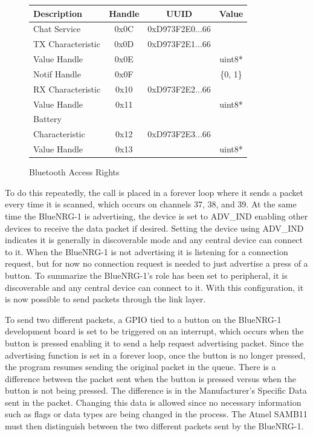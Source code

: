 \documentclass[journal,compsoc]{IEEEtran}
\begin{document}
\begin{figure}
  \begin{tabular}{|l|c|c|c|}
      \hline
      Description         &Handle& UUID              & Value\\
      \hline
      Chat Service 	      & 0x0C & 0xD973F2E0...66   & \\
      \hline
      TX Characteristic   & 0x0D & 0xD973F2E1...66   & \\
      \hline
      Value Handle	      & 0x0E & 				     & uint8*\\
      \hline
      Notif Handle        & 0x0F & 			         & \{0, 1\}\\
      \hline
      RX Characteristic   & 0x10 & 0xD973F2E2...66   & \\
      \hline
      Value Handle		  & 0x11 &					 & uint8*\\
      \hline
      Battery 		      &		 &					 & \\
      Characteristic	  & 0x12 & 0xD973F2E3...66   & \\
      \hline
      Value Handle		  & 0x13 & 					 & uint8*\\
      \hline
  \end{tabular}
  \caption{Bluetooth Access Rights}
  \label{BT Access}
\end{figure}

To do this repeatedly, the call is placed in a forever loop where it sends a packet every time it is scanned, which occurs on channels 37, 38, and 39.  At the same time the BlueNRG-1 is advertising, the device is set to ADV\_IND enabling other devices to receive the data packet if desired.  Setting the device using ADV\_IND indicates it is generally in discoverable mode and any central device can connect to it.  When the BlueNRG-1 is not advertising it is listening for a connection request, but for now no connection request is needed to just advertise a press of a button. To summarize the BlueNRG-1’s role has been set to peripheral, it is discoverable and any central device can connect to it.  With this configuration, it is now possible to send packets through the link layer.

To send two different packets, a GPIO tied to a button on the BlueNRG-1 development board is set to be triggered on an interrupt, which occurs when the button is pressed enabling it to send a help request advertising packet.  Since the advertising function is set in a forever loop, once the button is no longer pressed, the program resumes sending the original packet in the queue.  There is a difference between the packet sent when the button is pressed versus when the button is not being pressed.  The difference is in the Manufacturer’s Specific Data sent in the packet.  Changing this data is allowed since no necessary information such as flags or data types are being changed in the process.  The Atmel SAMB11 must then distinguish between the two different packets sent by the BlueNRG-1.
\end{document}
